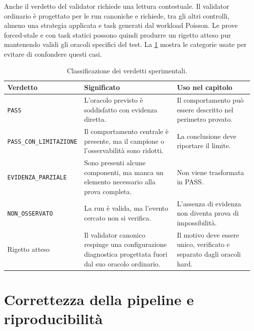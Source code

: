 Anche il verdetto del validator richiede una lettura contestuale. Il validator ordinario è progettato per le run canoniche e richiede, tra gli altri controlli, almeno una strategia applicata e task generati dal workload Poisson. Le prove forced-stale e con task statici possono quindi produrre un rigetto atteso pur mantenendo validi gli oracoli specifici del test. La \cref{tab:exp_verdetti} mostra le categorie usate per evitare di confondere questi casi.

\begin{table}[htbp]
    \centering
    \caption{Classificazione dei verdetti sperimentali.}
    \label{tab:exp_verdetti}
    \small
    \begin{tabularx}{\textwidth}{
        >{\raggedright\arraybackslash}p{}
        >{\raggedright\arraybackslash}X
        >{\raggedright\arraybackslash}p{}
    }
        \toprule
        \textbf{Verdetto} &
        \textbf{Significato} &
        \textbf{Uso nel capitolo} \\
        \midrule
        \texttt{PASS} &
        L'oracolo previsto è soddisfatto con evidenza diretta. &
        Il comportamento può essere descritto nel perimetro provato. \\
        \texttt{PASS\_CON\_}\allowbreak\texttt{LIMITAZIONE} &
        Il comportamento centrale è presente, ma il campione o l'osservabilità sono ridotti. &
        La conclusione deve riportare il limite. \\
        \texttt{EVIDENZA\_}\allowbreak\texttt{PARZIALE} &
        Sono presenti alcune componenti, ma manca un elemento necessario alla prova completa. &
        Non viene trasformata in PASS. \\
        \texttt{NON\_}\allowbreak\texttt{OSSERVATO} &
        La run è valida, ma l'evento cercato non si verifica. &
        L'assenza di evidenza non diventa prova di impossibilità. \\
        Rigetto atteso &
        Il validator canonico respinge una configurazione diagnostica progettata fuori dal suo oracolo ordinario. &
        Il motivo deve essere unico, verificato e separato dagli oracoli hard. \\
        \bottomrule
    \end{tabularx}
\end{table}

\section{Correttezza della pipeline e riproducibilità}
\label{sec:exp_validazione}

